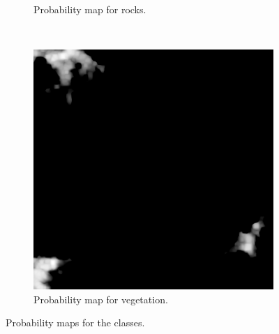 \documentclass[10pt,twocolumn,letterpaper]{article}
\begin{document}
\begin{figure}[t]
\begin{subfigure}[b]{0.37\textwidth}
      \caption{Probability map for rocks.}
    \label{fig:prob-rocks}
  \end{subfigure}
  ~
  \begin{subfigure}[b]{0.37\textwidth}
      \includegraphics[width=\textwidth]{figures/probabilidade-vegetacao.png}
      \caption{Probability map for vegetation.}
  \label{fig:prob-vegetation}
  \end{subfigure}

  \caption{Probability maps for the classes.}
  \label{fig:prob_map}
\end{figure}
\end{document}
